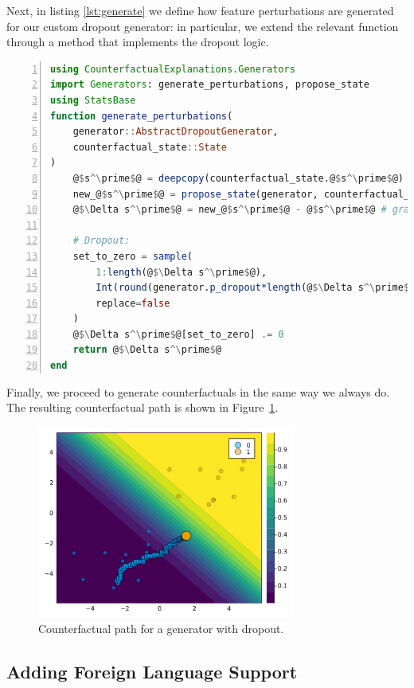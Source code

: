 \documentclass{juliacon}
\begin{document}
Next, in listing \ref{lst:generate} we define how feature perturbations
are generated for our custom dropout generator: in particular, we extend
the relevant function through a method that implements the dropout
logic.

\begin{lstlisting}[language=Julia, escapechar=@, numbers=left, label={lst:generate}, caption={.}]
using CounterfactualExplanations.Generators
import Generators: generate_perturbations, propose_state
using StatsBase
function generate_perturbations(
    generator::AbstractDropoutGenerator, 
    counterfactual_state::State
)
    @$s^\prime$@ = deepcopy(counterfactual_state.@$s^\prime$@)
    new_@$s^\prime$@ = propose_state(generator, counterfactual_state)
    @$\Delta s^\prime$@ = new_@$s^\prime$@ - @$s^\prime$@ # gradient step

    # Dropout:
    set_to_zero = sample(
        1:length(@$\Delta s^\prime$@),
        Int(round(generator.p_dropout*length(@$\Delta s^\prime$@))),
        replace=false
    )
    @$\Delta s^\prime$@[set_to_zero] .= 0
    return @$\Delta s^\prime$@
end
\end{lstlisting}

Finally, we proceed to generate counterfactuals in the same way we
always do. The resulting counterfactual path is shown in
Figure~\ref{fig-dropout}.

\begin{figure}

{\centering \includegraphics[width=3.33333in,height=2.5in]{www/dropout.png}

}

\caption{\label{fig-dropout}Counterfactual path for a generator with
dropout.}

\end{figure}

\hypertarget{adding-foreign-language-support}{%
\subsection{Adding Foreign Language
Support}\label{adding-foreign-language-support}}
\end{document}
